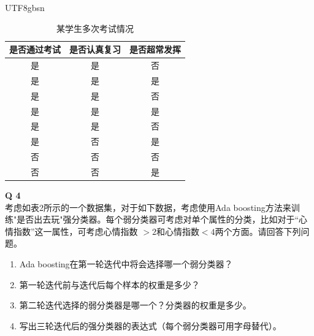 \documentclass[a4paper, 11pt]{article}
\newenvironment{problem}[2][Q]
    { \begin{mdframed}[backgroundcolor=gray!20] \textbf{#1 #2} \\}
    {  \end{mdframed}}
\begin{document}
\begin{CJK}{UTF8}{gbsn}
\begin{table}[h]
    \centering
    \caption{某学生多次考试情况}
    \label{tab:number}
    \begin{tabular}{ccc}
        \hline
        是否通过考试 & 是否认真复习 & 是否超常发挥 \\
        \hline \hline
        是 & 是 & 否 \\ \hline
        是 & 是 & 是 \\ \hline
        是 & 是 & 否 \\ \hline
        是 & 是 & 是 \\ \hline
        是 & 是 & 否 \\ \hline
        是 & 否 & 是 \\ \hline
        否 & 否 & 否 \\ \hline
        否 & 否 & 是 \\ \hline
    \end{tabular}
\end{table}


\begin{problem}{4}
考虑如表2所示的一个数据集，对于如下数据，考虑使用Ada boosting方法来训练"是否出去玩"强分类器。每个弱分类器可考虑对单个属性的分类，比如对于“心情指数”这一属性，可考虑心情指数 $>2$和心情指数$<4$两个方面。请回答下列问题。
\begin{enumerate}[1)]
    \item Ada boosting在第一轮迭代中将会选择哪一个弱分类器？
    \item 第一轮迭代前与迭代后每个样本的权重是多少？
    \item 第二轮迭代选择的弱分类器是哪一个？分类器的权重是多少。
    \item 写出三轮迭代后的强分类器的表达式（每个弱分类器可用字母替代）。
\end{enumerate}
\end{problem}


\end{CJK}
\end{document}
